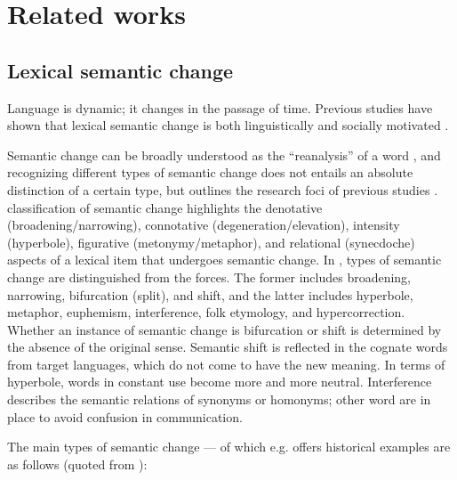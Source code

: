     

\chapter{Related works}
\label{related_works}

\section{Lexical semantic change}
Language is dynamic; it changes in the passage of time. Previous studies have shown that lexical semantic change is both linguistically and socially motivated \parencite{kutuzov2017tracing,kutuzov2018survey,hamilton2016cultural}. 

Semantic change can be broadly understood as the ``reanalysis'' of a word \parencite[650]{fortson2017approach}, and recognizing different types of semantic change does not entails an absolute distinction of a certain type, but outlines the research foci of previous studies \parencites[650]{fortson2017approach}{traugott2017semantic}. \textcite{bloomfield1933language} classification of semantic change highlights the denotative (broadening/narrowing), connotative (degeneration/elevation), intensity (hyperbole), figurative (metonymy/metaphor), and relational (synecdoche) aspects of a lexical item that undergoes semantic change. In \textcite[199-205]{semanticincrowley2010}, types of semantic change are distinguished from the forces. The former includes broadening, narrowing, bifurcation (split), and shift, and the latter includes hyperbole, metaphor, euphemism, interference, folk etymology, and hypercorrection. Whether an instance of semantic change is bifurcation or shift is determined by the absence of the original sense. Semantic shift is reflected in the cognate words from target languages, which do not come to have the new meaning. In terms of hyperbole, words in constant use become more and more neutral. Interference describes the semantic relations of synonyms or homonyms; other word are in place to avoid confusion in communication.

The main types of semantic change — of which e.g. \textcite{traugott2017semantic} offers historical examples are as follows (quoted from \parencite[6]{giulianelli2019lexical}):

